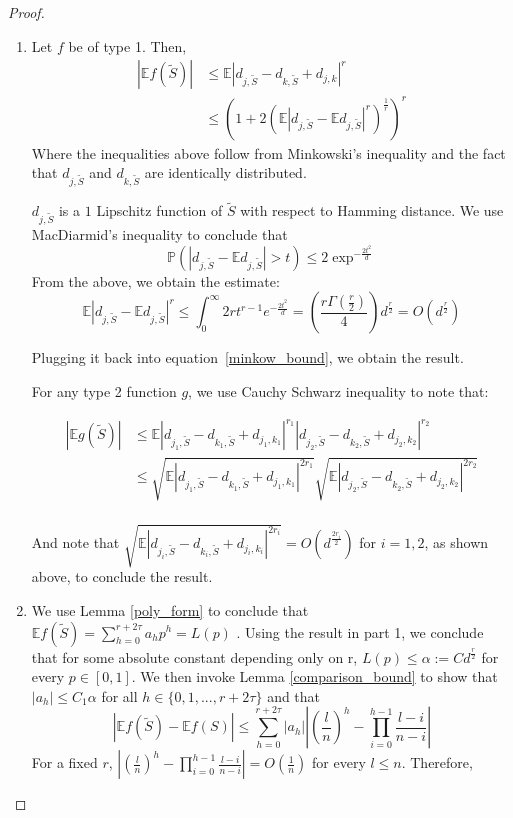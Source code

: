 \documentclass[final,12pt]{colt2018}
\begin{document}
\begin{proof}

\begin{enumerate}
\item
Let $f$ be of type 1. Then,
\begin{align}
|\mathbb{E}f(\tilde{S})| &\leq \mathbb{E} |d_{j,\tilde{S}} - d_{k,\tilde{S}} + d_{j,k}|^r \nonumber \\
&\leq \left( 1 + 2\left(\mathbb{E} |d_{j,\tilde{S}} - \mathbb{E}d_{j,\tilde{S}} |^r\right)^{\frac{1}{r}} \right)^r \label{minkow_bound}
\end{align}
Where the inequalities above follow from Minkowski's inequality and the fact that $d_{j,\tilde{S}}$ and $d_{k,\tilde{S}}$ are identically distributed.

$d_{j,\tilde{S}}$ is a $1$ Lipschitz function of $\tilde{S}$ with respect to Hamming distance. 
We use MacDiarmid's inequality to conclude that $$\mathbb{P}(|d_{j,\tilde{S}} - \mathbb{E}d_{j,\tilde{S}}| > t ) \leq 2 \exp^{-\frac{2t^2}{d}} $$
From the above, we obtain the estimate: $$\mathbb{E}|d_{j,\tilde{S}} - \mathbb{E}d_{j,\tilde{S}} |^r \leq \int_{0}^{\infty}2r t^{r-1} e^{-\frac{2t^2}{d}} = \left(\frac{r\Gamma(\frac{r}{2})}{4}\right) d^{\frac{r}{2}} = O(d^{\frac{r}{2}})$$

Plugging it back into equation~\eqref{minkow_bound}, we obtain the result.

For any type 2 function $g$, we use Cauchy Schwarz inequality to note that:

\begin{align*}
|\mathbb{E}g(\tilde{S})| &\leq \mathbb{E} |d_{j_1,\tilde{S}} - d_{k_1,\tilde{S}} + d_{j_1,k_1}|^{r_1} |d_{j_2,\tilde{S}} - d_{k_2,\tilde{S}} + d_{j_2,k_2}|^{r_2} \\
&\leq \sqrt{\mathbb{E} |d_{j_1,\tilde{S}} - d_{k_1,\tilde{S}} + d_{j_1,k_1}|^{2r_1}} \sqrt{\mathbb{E} |d_{j_2,\tilde{S}} - d_{k_2,\tilde{S}} + d_{j_2,k_2}|^{2r_2}}\\
\end{align*}

And note that $\sqrt{\mathbb{E} |d_{j_i,\tilde{S}} - d_{k_i,\tilde{S}} + d_{j_i,k_i}|^{2r_i}} = O\left(d^{\frac{2r_i}{2}}\right)$ for $i = 1,2$, as shown above, to conclude the result.

\item
We use Lemma \ref{poly_form} to conclude that $\mathbb{E}f(\tilde{S})= \sum_{h=0}^{r+2\tau} a_h p^h = L(p)$ . Using the result in part 1, we conclude that for some absolute constant depending only on r, $L(p) \leq \alpha := Cd^{\frac{r}{2}}$ for every $p \in [0,1]$. We then invoke Lemma \ref{comparison_bound} to show that $|a_h| \leq C_1\alpha$ for all $h \in \{0,1,...,r+2\tau\}$ and that 
$$|\mathbb{E}f(\tilde{S}) - \mathbb{E}f(S)| \leq \sum_{h=0}^{r+2\tau} |a_h| \left|\left(\frac{l}{n}\right)^h - \prod_{i=0}^{h-1} \frac{l-i}{n-i}\right|$$ For a fixed $r$, $|\left(\frac{l}{n}\right)^h - \prod_{i=0}^{h-1} \frac{l-i}{n-i}| = O(\frac{1}{n})$ for every $l \leq n$. Therefore,  


\end{enumerate}
\end{proof}
\end{document}
